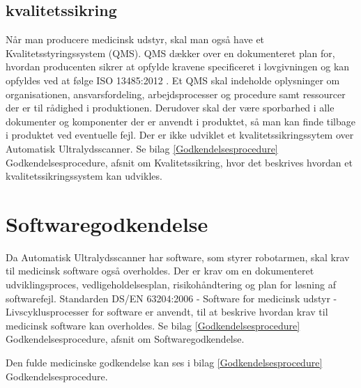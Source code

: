 \subsection{kvalitetssikring}
Når man producere medicinsk udstyr, skal man også have et Kvalitetsstyringssystem (QMS). QMS dækker over en dokumenteret plan for, hvordan producenten sikrer at opfylde kravene specificeret i lovgivningen og kan opfyldes ved at følge ISO 13485:2012 \cite{13485}. Et QMS skal indeholde oplysninger om organisationen, ansvarsfordeling, arbejdsprocesser og procedure samt ressourcer der er til rådighed i produktionen. Derudover skal der være sporbarhed i alle dokumenter og komponenter der er anvendt i produktet, så man kan finde tilbage i produktet ved eventuelle fejl. \cite{13485}
Der er ikke udviklet et kvalitetssikringssytem over Automatisk Ultralydsscanner. Se bilag \ref {Godkendelsesprocedure} Godkendelsesprocedure, afsnit om Kvalitetssikring, hvor det beskrives hvordan et kvalitetssikringssystem kan udvikles. 

\section{Softwaregodkendelse}
Da Automatisk Ultralydsscanner har software, som styrer robotarmen, skal krav til medicinsk software også overholdes. Der er krav om en dokumenteret udviklingsproces, vedligeholdelsesplan, risikohåndtering og plan for løsning af softwarefejl. Standarden DS/EN 63204:2006 - Software for medicinsk udstyr - Livscyklusprocesser for software \cite{software} er anvendt, til at beskrive hvordan krav til medicinsk software kan overholdes. Se bilag \ref {Godkendelsesprocedure} Godkendelsesprocedure, afsnit om Softwaregodkendelse.

Den fulde medicinske godkendelse kan ses i bilag \ref {Godkendelsesprocedure} Godkendelsesprocedure.
